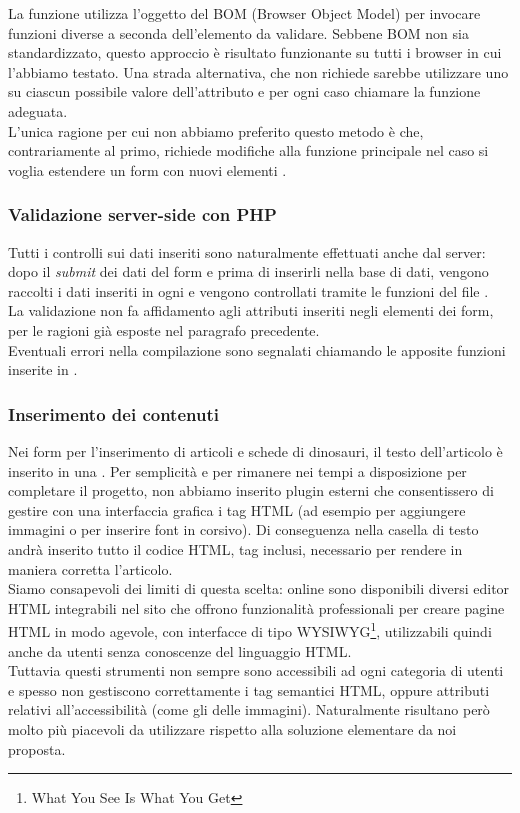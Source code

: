 \documentclass[12pt]{article}
\begin{document}
	La funzione  utilizza l'oggetto  del BOM (Browser Object Model) per invocare funzioni diverse a seconda dell'elemento da validare. Sebbene BOM non sia standardizzato, questo approccio è risultato funzionante su tutti i browser in cui l'abbiamo testato. Una strada alternativa, che non richiede  sarebbe utilizzare uno  su ciascun possibile valore dell'attributo  e per ogni caso chiamare la funzione adeguata.\\ L'unica ragione per cui non abbiamo preferito questo metodo è che, contrariamente al primo, richiede modifiche alla funzione principale  nel caso si voglia estendere un form con nuovi elementi . 
	
	\subsubsection*{Validazione server-side con PHP}
	Tutti i controlli sui dati inseriti sono naturalmente effettuati anche dal server: dopo il \textit{submit} dei dati del form e prima di inserirli nella base di dati, vengono raccolti i dati inseriti in ogni  e vengono controllati tramite le funzioni del file . \\
	La validazione non fa affidamento agli attributi inseriti negli elementi dei form, per le ragioni già esposte nel paragrafo precedente.\\
	Eventuali errori nella compilazione sono segnalati chiamando le apposite funzioni inserite in .

	
	\subsubsection{Inserimento dei contenuti} \label{sssec:inserimentocontenuti}
	Nei form per l'inserimento di articoli e schede di dinosauri, il testo dell'articolo è inserito in una . Per semplicità e per rimanere nei tempi a disposizione per completare il progetto, non abbiamo inserito plugin esterni che consentissero di gestire con una interfaccia grafica i tag HTML (ad esempio per aggiungere immagini o per inserire font in corsivo). Di conseguenza nella casella di testo andrà inserito tutto il codice HTML, tag inclusi, necessario per rendere in maniera corretta l'articolo. \\
	Siamo consapevoli dei limiti di questa scelta: online sono disponibili diversi editor HTML integrabili nel sito che offrono funzionalità professionali per creare pagine HTML in modo agevole, con interfacce di tipo WYSIWYG\footnote{What You See Is What You Get}, utilizzabili quindi anche da utenti senza conoscenze del linguaggio HTML.\\
	Tuttavia questi strumenti non sempre sono accessibili ad ogni categoria di utenti e spesso non gestiscono correttamente i tag semantici HTML, oppure attributi relativi all'accessibilità (come gli  delle immagini). Naturalmente risultano però molto più piacevoli da utilizzare rispetto alla soluzione elementare da noi proposta.
	
\end{document}
